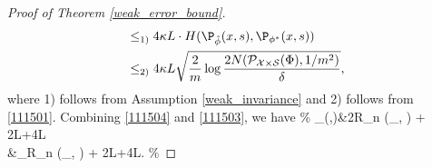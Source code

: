 \begin{proof}[Proof of Theorem \ref{weak_error_bound}]
\begin{align}
& \leq_{1)} 4\kappa L  \cdot H (\P_{\hat{\phi}}(x,s),\P_{\phi^{*}}(x,s))\notag\\
&\leq_{2)} 4\kappa L\sqrt{\frac{2}{m} \log \frac{2N(\mathcal{P}_{\mathcal{X} \times \mathcal{S}}(\Phi), 1 / m^2)}{\delta}},
\end{align}
where 1) follows from Assumption \ref{weak_invariance} and 2) follows from \eqref{111501}.
Combining \eqref{111504} and \eqref{111503}, we have
\%
_{\ell}(\hat{\phi},\hat\psi)&\leq 2R_{n} (\ell \circ {}_{\hat{\phi}, \Psi}) + 2L+4\kappa L\notag\\
&\max_{\phi\in\Phi}R_{n} (\ell \circ {}_{{\phi}, \Psi}) + 2L+4\kappa L.
\%
\end{proof}
